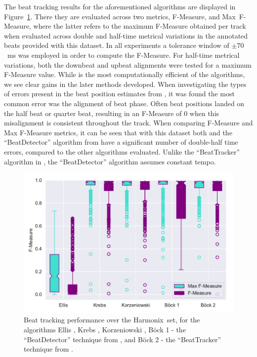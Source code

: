 \documentclass{article}
\newcommand{\setName}{Harmonix}
\begin{document}
The beat tracking results for the aforementioned algorithms are displayed in Figure~\ref{fig:beat_results}. There they are evaluated across two metrics,
F-Measure, and Max~F-Measure, where the latter refers to the maximum F-Measure obtained per track when evaluated across double and half-time metrical variations
in the annotated beats provided with this dataset. In all experiments a tolerance window of  $\pm 70$~ms was employed in order to compute the F-Measure. For half-time metrical variations, both the downbeat and upbeat alignments were tested for a maximum F-Measure
value. While \cite{Ellis2007} is the most computationally efficient of the algorithms, we see clear gains in the later methods developed. When investigating the types
of errors present in the beat position estimates from \cite{Ellis2007}, it was found the most common error was the alignment of beat phase. Often beat positions landed
on the half beat or quarter beat, resulting in an F-Measure of 0 when this misalignment is consistent throughout the track.
When comparing F-Measure and Max F-Measure metrics, it can be seen that with 
this dataset both \cite{Ellis2007} and the ``BeatDetector'' algorithm from \cite{Bock2011} have a significant number of double-half time errors, compared to the other algorithms evaluated.
Unlike the ``BeatTracker'' algorithm in \cite{Bock2011}, the ``BeatDetector'' algorithm assumes constant tempo.

\begin{figure}
    \centerline{\includegraphics[width=\columnwidth]{figs/2019_04_09_19_15_00_Beat_TrackiMax_F-Measure.pdf}}
    \caption{Beat tracking performance over the \setName~set, for the algorithms Ellis \cite{Ellis2007}, Krebs \cite{Krebs2015}, Korzeniowski \cite{Korzeniowski2014}, B{\"o}ck 1 - the ``BeatDetector'' technique from \cite{Bock2011}, and B{\"o}ck 2 - the ``BeatTracker'' technique from \cite{Bock2011}.}
    \label{fig:beat_results}
\end{figure}
\end{document}
